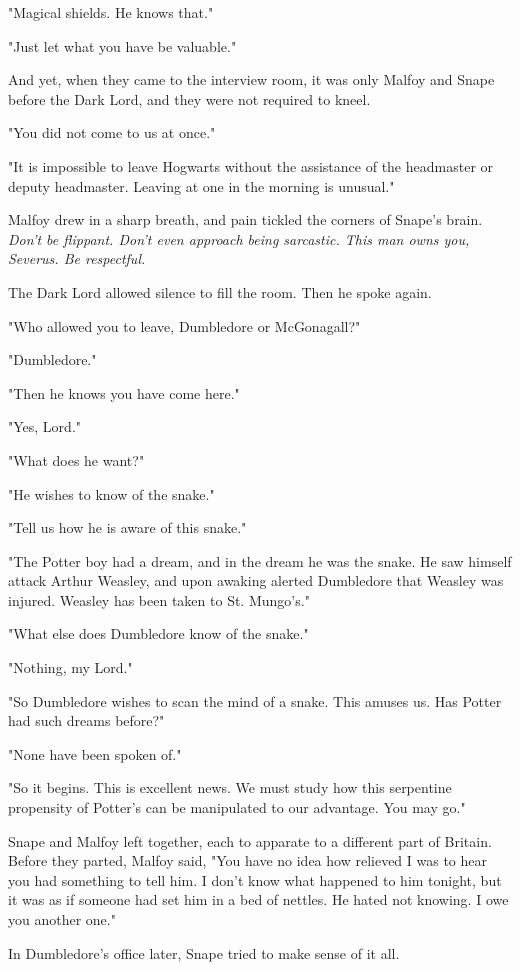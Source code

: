 "Magical shields. He knows that."

"Just let what you have be valuable."

And yet, when they came to the interview room, it was only Malfoy and Snape before the Dark Lord, and they were not required to kneel.

"You did not come to us at once."

"It is impossible to leave Hogwarts without the assistance of the headmaster or deputy headmaster. Leaving at one in the morning is unusual."

Malfoy drew in a sharp breath, and pain tickled the corners of Snape's brain. \emph{Don't be flippant. Don't even approach being sarcastic. This man owns you, Severus. Be respectful.}

The Dark Lord allowed silence to fill the room. Then he spoke again.

"Who allowed you to leave, Dumbledore or McGonagall?"

"Dumbledore."

"Then he knows you have come here."

"Yes, Lord."

"What does he want?"

"He wishes to know of the snake."

"Tell us how he is aware of this snake."

"The Potter boy had a dream, and in the dream he was the snake. He saw himself attack Arthur Weasley, and upon awaking alerted Dumbledore that Weasley was injured. Weasley has been taken to St. Mungo's."

"What else does Dumbledore know of the snake."

"Nothing, my Lord."

"So Dumbledore wishes to scan the mind of a snake. This amuses us. Has Potter had such dreams before?"

"None have been spoken of."

"So it begins. This is excellent news. We must study how this serpentine propensity of Potter's can be manipulated to our advantage. You may go."

Snape and Malfoy left together, each to apparate to a different part of Britain. Before they parted, Malfoy said, "You have no idea how relieved I was to hear you had something to tell him. I don't know what happened to him tonight, but it was as if someone had set him in a bed of nettles. He hated not knowing. I owe you another one."

In Dumbledore's office later, Snape tried to make sense of it all.


